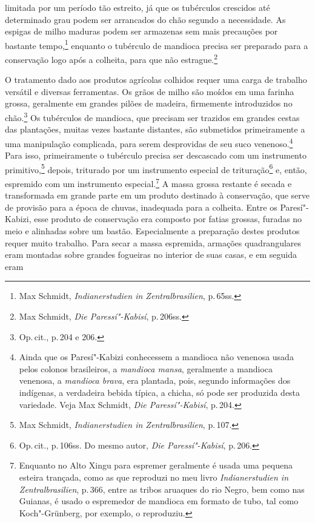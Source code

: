 limitada por um período tão estreito, já que os tubérculos crescidos até
determinado grau podem ser arrancados do chão segundo a necessidade. As
espigas de milho maduras podem ser armazenas sem mais precauções por
bastante tempo,\footnote{Max Schmidt, \textit{Indianerstudien in
  Zentralbrasilien}, p.\,65ss.} enquanto o tubérculo de mandioca
precisa ser preparado para a conservação logo após a colheita, para que
não estrague.\footnote{Max Schmidt, \textit{Die Paressí"-Kabisí}, p.\,206ss.}

O tratamento dado aos produtos agrícolas colhidos requer uma carga de
trabalho versátil e diversas ferramentas. Os grãos de milho são moídos
em uma farinha grossa, geralmente em grandes pilões de madeira,
firmemente introduzidos no chão.\footnote{Op.\,cit., p.\,204 e 206.} Os
tubérculos de mandioca, que precisam ser trazidos em grandes cestas das
plantações, muitas vezes bastante distantes, são submetidos
primeiramente a uma manipulação complicada, para serem desprovidas de
seu suco venenoso.\footnote{Ainda que os Paresí"-Kabizi conhecessem a
  mandioca não venenosa usada pelos colonos brasileiros, a \textit{mandioca
  mansa}, geralmente a mandioca venenosa, a \textit{mandioca brava}, era
  plantada, pois, segundo informações dos indígenas, a verdadeira bebida
  típica, a chicha, só pode ser produzida desta variedade. Veja Max
  Schmidt, \textit{Die Paressí"-Kabisí}, p.\,204.} Para isso,
primeiramente o tubérculo precisa ser descascado com um instrumento
primitivo,\footnote{Max Schmidt, \textit{Indianerstudien in
  Zentralbrasilien}, p.\,107.} depois, triturado por um instrumento
especial de trituração\footnote{Op.\,cit., p.\,106ss. Do mesmo autor,
  \textit{Die Paressí"-Kabisí}, p.\,206.} e, então, espremido com um
instrumento especial.\footnote{Enquanto no Alto Xingu para espremer
  geralmente é usada uma pequena esteira trançada, como as que reproduzi
  no meu livro \textit{Indianerstudien in Zentralbrasilien}, p.\,366,
  entre as tribos aruaques do rio Negro, bem como nas Guianas, é usado o
  espremedor de mandioca em formato de tubo, tal como Koch"-Grünberg, por
  exemplo, o reproduziu.} A massa grossa restante é secada e
transformada em grande parte em um produto destinado à conservação,
que serve de provisão para a época de chuvas, inadequada para a
colheita. Entre os Paresí"-Kabizi, esse produto de conservação era
composto por fatias grossas, furadas no meio e alinhadas sobre um
bastão. Especialmente a preparação destes produtos requer
muito trabalho. Para secar a massa espremida, armações quadrangulares
eram montadas sobre grandes fogueiras no interior de suas casas, e em seguida eram 
